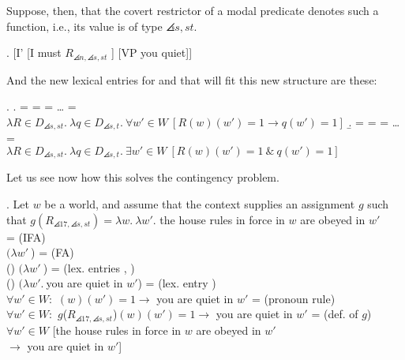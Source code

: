 Suppose, then, that the covert restrictor of a modal predicate denotes
such a function, i.e., its value is of type $\angles{s,st}$.

\exi. \label{newnewlf} [I' [I must $R_{\angles{n,\angles{s,st}}}$ ] [VP you quiet]]

And the new lexical entries for  and 
that will fit this new structure are these:

\ex. \a.  =  =  = \dots{} =\\
$\lambda R\in D_{\angles{s,st}}.\ \lambda q\in D_{\angles{s,t}}.\ \forall w'\in W\ [R(w)(w') =1 \rightarrow q(w')=1]$
\b.  =  =  = \dots{} =\\
$\lambda R\in D_{\angles{s,st}}.\ \lambda q\in D_{\angles{s,t}}.\ \exists w'\in W\ [R(w)(w')=1\ \&\ q(w')=1]$

Let us see now how this solves the contingency problem.

\ex. Let $w$ be a world, and assume that the context supplies an assignment $g$ such that $g(R_{\angles{17,\angles{s,st}}}) = \lambda w.\ \lambda w'.$ the house rules in force in $w$ are obeyed in $w'$\\[9pt]
 = \hfill{\tiny (IFA)}\\
$(\lambda w'\ $) = \hfill{\tiny (FA)}\\
 () $(\lambda w'\ $) = \hfill{\tiny (lex. entries , )}\\
 () $(\lambda w'.\ $you are quiet in $w'$) = \hfill{\tiny (lex. entry )}\\
$\forall w'\in W:$ $(w)(w') =1 \rightarrow $ you are quiet in $w'$ = \hfill{\tiny (pronoun rule)}\\
$\forall w'\in W:$ $g$({$R_{\angles{17,\angles{s,st}}}$})$(w)(w') =1 \rightarrow $ you are quiet in $w'$ = \hfill{\tiny (def. of $g$)}\\
$\forall w'\in W$ [the house rules in force in $w$ are obeyed in $w'$ \\
\null\hfill $\rightarrow$ you are quiet in $w'$]

